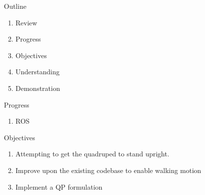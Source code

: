 \documentclass{beamer}
\begin{document}
\begin{frame}\titlepage\end{frame}\normalfont


\begin{frame}{Outline}
	\begin{enumerate}
            \item Review
		\item Progress
            \item Objectives
            \item Understanding
            \item Demonstration
	\end{enumerate}
\end{frame}\normalfont
\begin{frame}{Progress}
        \begin{enumerate}
            \item ROS
        \end{enumerate}
\end{frame}\normalfont
\begin{frame}{Objectives}
        \begin{enumerate}
            \item{Attempting to get the quadruped to stand upright.}
            \item{Improve upon the existing codebase to enable walking motion}
            \item{Implement a QP formulation}
        \end{enumerate}
\end{frame}\normalfont
\end{document}
